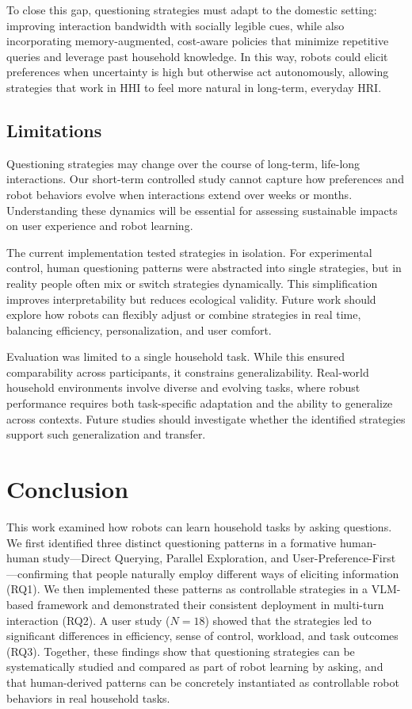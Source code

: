 \documentclass[sigconf,authordraft]{acmart}
\begin{document}
To close this gap, questioning strategies must adapt to the domestic setting: improving interaction bandwidth with socially legible cues, while also incorporating memory-augmented, cost-aware policies that minimize repetitive queries and leverage past household knowledge. In this way, robots could elicit preferences when uncertainty is high but otherwise act autonomously, allowing strategies that work in HHI to feel more natural in long-term, everyday HRI.

\subsection{Limitations}
Questioning strategies may change over the course of long-term, life-long interactions. Our short-term controlled study cannot capture how preferences and robot behaviors evolve when interactions extend over weeks or months. Understanding these dynamics will be essential for assessing sustainable impacts on user experience and robot learning. 

The current implementation tested strategies in isolation. For experimental control, human questioning patterns were abstracted into single strategies, but in reality people often mix or switch strategies dynamically. This simplification improves interpretability but reduces ecological validity. Future work should explore how robots can flexibly adjust or combine strategies in real time, balancing efficiency, personalization, and user comfort. 

Evaluation was limited to a single household task. While this ensured comparability across participants, it constrains generalizability. Real-world household environments involve diverse and evolving tasks, where robust performance requires both task-specific adaptation and the ability to generalize across contexts. Future studies should investigate whether the identified strategies support such generalization and transfer. 


\section{Conclusion}
This work examined how robots can learn household tasks by asking questions. We first identified three distinct questioning patterns in a formative human-human study—Direct Querying, Parallel Exploration, and User-Preference-First—confirming that people naturally employ different ways of eliciting information (RQ1). We then implemented these patterns as controllable strategies in a VLM-based framework and demonstrated their consistent deployment in multi-turn interaction (RQ2). A user study ($N=18$) showed that the strategies led to significant differences in efficiency, sense of control, workload, and task outcomes (RQ3). Together, these findings show that questioning strategies can be systematically studied and compared as part of robot learning by asking, and that human-derived patterns can be concretely instantiated as controllable robot behaviors in real household tasks.


\end{document}
